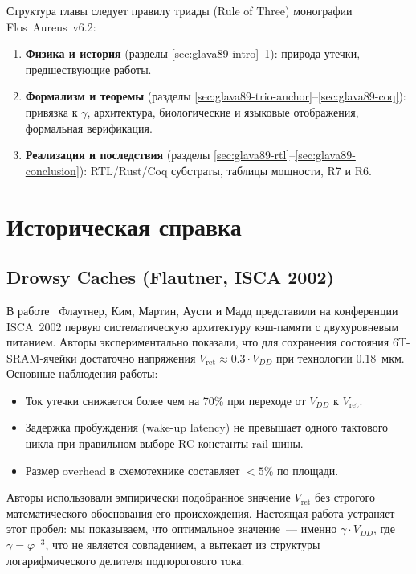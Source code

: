 Структура главы следует правилу триады (Rule of Three)
монографии Flos~Aureus~v6.2:
\begin{enumerate}
  \item \textbf{Физика и история} (разделы \ref{sec:glava89-intro}--\ref{sec:glava89-history}):
        природа утечки, предшествующие работы.
  \item \textbf{Формализм и теоремы} (разделы \ref{sec:glava89-trio-anchor}--\ref{sec:glava89-coq}):
        привязка к $\gamma$, архитектура, биологические и языковые
        отображения, формальная верификация.
  \item \textbf{Реализация и последствия} (разделы \ref{sec:glava89-rtl}--\ref{sec:glava89-conclusion}):
        RTL/Rust/Coq субстраты, таблицы мощности, R7 и R6.
\end{enumerate}

\section{Историческая справка}
\label{sec:glava89-history}

\subsection{Drowsy Caches (Flautner, ISCA 2002)}

В работе~\cite{FlautnerISCA2002} Флаутнер, Ким, Мартин, Аусти и Мадд
представили на конференции ISCA~2002 первую систематическую
архитектуру кэш-памяти с двухуровневым питанием.
Авторы экспериментально показали, что для сохранения состояния
6T-SRAM-ячейки достаточно напряжения $V_\mathrm{ret} \approx 0.3 \cdot V_{DD}$
при технологии 0.18~мкм.
Основные наблюдения работы:
%
\begin{itemize}
  \item Ток утечки снижается более чем на 70\% при переходе
        от $V_{DD}$ к $V_\mathrm{ret}$.
  \item Задержка пробуждения (wake-up latency) не превышает одного
        тактового цикла при правильном выборе RC-константы rail-шины.
  \item Размер overhead в схемотехнике составляет $< 5\%$ по площади.
\end{itemize}
%
Авторы использовали эмпирически подобранное значение $V_\mathrm{ret}$
без строгого математического обоснования его происхождения.
Настоящая работа устраняет этот пробел: мы показываем, что
оптимальное значение~--- именно $\gamma \cdot V_{DD}$, где $\gamma = \varphi^{-3}$,
что не является совпадением, а вытекает из структуры
логарифмического делителя подпорогового тока.

